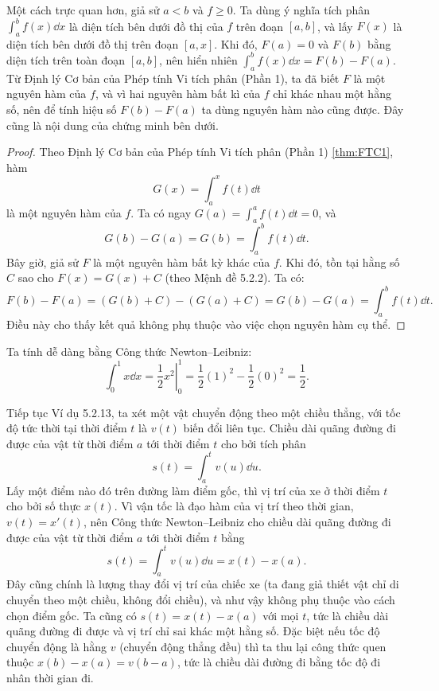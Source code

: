 Một cách trực quan hơn, giả sử $a < b$ và $f \ge 0$. Ta dùng ý nghĩa tích phân $\int_a^b f(x) \dd x$ là diện tích bên dưới đồ thị của $f$ trên đoạn $[a, b]$, và lấy $F(x)$ là diện tích bên dưới đồ thị trên đoạn $[a, x]$. Khi đó, $F(a) = 0$ và $F(b)$ bằng diện tích trên toàn đoạn $[a, b]$, nên hiển nhiên $\int_a^b f(x) \dd x = F(b) - F(a)$. Từ Định lý Cơ bản của Phép tính Vi tích phân (Phần 1), ta đã biết $F$ là một nguyên hàm của $f$, và vì hai nguyên hàm bất kì của $f$ chỉ khác nhau một hằng số, nên để tính hiệu số $F(b) - F(a)$ ta dùng nguyên hàm nào cũng được. Đây cũng là nội dung của chứng minh bên dưới.

\begin{proof}
    Theo Định lý Cơ bản của Phép tính Vi tích phân (Phần 1) \ref{thm:FTC1}, hàm
    \[ G(x) = \int_a^x f(t) \dd t \]
    là một nguyên hàm của $f$. Ta có ngay $G(a) = \int_a^a f(t) \dd t = 0$, và
    \[ G(b) - G(a) = G(b) = \int_a^b f(t) \dd t. \]
    Bây giờ, giả sử $F$ là một nguyên hàm bất kỳ khác của $f$. Khi đó, tồn tại hằng số $C$ sao cho $F(x) = G(x) + C$ (theo Mệnh đề 5.2.2). Ta có:
    \[ F(b) - F(a) = (G(b)+C) - (G(a)+C) = G(b) - G(a) = \int_a^b f(t) \dd t. \]
    Điều này cho thấy kết quả không phụ thuộc vào việc chọn nguyên hàm cụ thể.
\end{proof}

\begin{example}
    Ta tính dễ dàng bằng Công thức Newton–Leibniz:
    \[ \int_{0}^{1} x \dd x = \left. \frac{1}{2}x^2 \right|_0^1 = \frac{1}{2}(1)^2 - \frac{1}{2}(0)^2 = \frac{1}{2}. \]
\end{example}

\begin{example}
    Tiếp tục Ví dụ 5.2.13, ta xét một vật chuyển động theo một chiều thẳng, với tốc độ tức thời tại thời điểm $t$ là $v(t)$ biến đổi liên tục. Chiều dài quãng đường đi được của vật từ thời điểm $a$ tới thời điểm $t$ cho bởi tích phân
    \[ s(t) = \int_a^t v(u) \dd u. \]
    Lấy một điểm nào đó trên đường làm điểm gốc, thì vị trí của xe ở thời điểm $t$ cho bởi số thực $x(t)$. Vì vận tốc là đạo hàm của vị trí theo thời gian, $v(t) = x'(t)$, nên Công thức Newton–Leibniz cho chiều dài quãng đường đi được của vật từ thời điểm $a$ tới thời điểm $t$ bằng
    \[ s(t) = \int_a^t v(u) \dd u = x(t) - x(a). \]
    Đây cũng chính là lượng thay đổi vị trí của chiếc xe (ta đang giả thiết vật chỉ di chuyển theo một chiều, không đổi chiều), và như vậy không phụ thuộc vào cách chọn điểm gốc. Ta cũng có $s(t) = x(t) - x(a)$ với mọi $t$, tức là chiều dài quãng đường đi được và vị trí chỉ sai khác một hằng số. Đặc biệt nếu tốc độ chuyển động là hằng $v$ (chuyển động thẳng đều) thì ta thu lại công thức quen thuộc $x(b) - x(a) = v(b - a)$, tức là chiều dài đường đi bằng tốc độ đi nhân thời gian đi.
\end{example}

